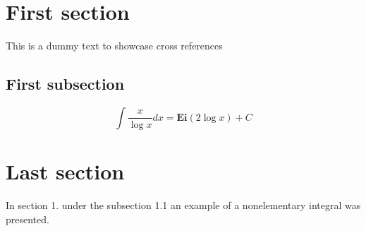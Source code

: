 \documentclass{article}
\begin{document}
\section{First section}
This is a dummy text to showcase cross references

\subsection{First subsection}



\[\int\frac{x}{\log{x}}dx=\mathbf{Ei}(2\log{x})+C\]

\section{Last section}
In section 1. under the subsection
1.1 an example of a nonelementary
integral was presented.
\end{document}
